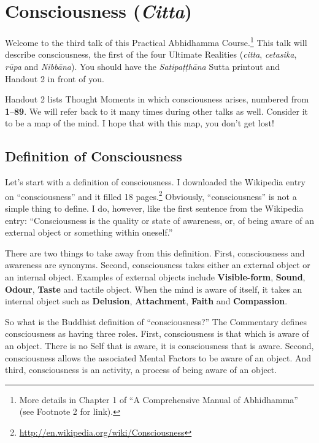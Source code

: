 \section{Consciousness (\textit{Citta})}

Welcome to the third talk of this Practical Abhidhamma Course.\footnote{More details in Chapter 1 of “A Comprehensive Manual of Abhidhamma” (see Footnote 2 for link).} This talk will describe consciousness, the first of the four Ultimate Realities (\textit{citta}, \textit{cetasika}, \textit{rūpa} and \textit{Nibbāna}). You should have the \textit{Satipaṭṭhāna} Sutta printout and Handout 2 in front of you. 

Handout 2 lists Thought Moments in which consciousness arises, numbered from \textbf{1}--\textbf{89}. We will refer back to it many times during other talks as well. Consider it to be a map of the mind. I hope that with this map, you don’t get lost!

\subsection*{Definition of Consciousness}

Let’s start with a definition of consciousness. I downloaded the Wikipedia entry on “consciousness” and it filled 18 pages.\footnote{\url{http://en.wikipedia.org/wiki/Consciousness}} Obviously, “consciousness” is not a simple thing to define. I do, however, like the first sentence from the Wikipedia entry: “Consciousness is the quality or state of awareness, or, of being aware of an external object or something within oneself.”

There are two things to take away from this definition. First, consciousness and awareness are synonyms. Second, consciousness takes either an external object or an internal object. Examples of external objects include \textbf{Visible-form}, \textbf{Sound}, \textbf{Odour}, \textbf{Taste} and tactile object. When the mind is aware of itself, it takes an internal object such as \textbf{Delusion}, \textbf{Attachment}, \textbf{Faith} and \textbf{Compassion}.

So what is the Buddhist definition of “consciousness?” The Commentary defines consciousness as having three roles. First, consciousness is that which is aware of an object. There is no Self that is aware, it is consciousness that is aware. Second, consciousness allows the associated Mental Factors to be aware of an object. And third, consciousness is an activity, a process of being aware of an object.

